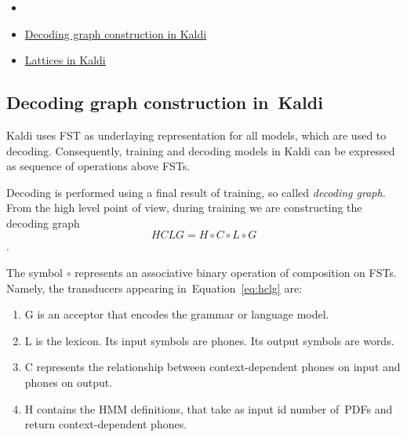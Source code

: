 \subsubsection*{} %

\begin{itemize}
    \item {}
    \item \href{http://kaldi.sourceforge.net/graph.html} {Decoding graph construction in Kaldi}
    \item \href{http://kaldi.sourceforge.net/lattices.html} {Lattices in Kaldi}
\end{itemize}

\subsection{Decoding graph construction in~Kaldi} %
Kaldi uses \ac{FST} as underlaying representation for all models, which are used to decoding. Consequently, 
training and decoding models in Kaldi can be expressed as sequence of operations above \acp{FST}.

Decoding is performed using a final result of training, so called {\it decoding graph}. 
From the high level point of view,
during training we are constructing the decoding graph 
\begin{equation} \label{eq:hclg}
HCLG = H\circ C\circ L\circ G
\end{equation}.

The symbol $\circ$ represents an associative binary operation of composition on \acp{FST}.
Namely, the transducers appearing in~Equation~\ref{eq:hclg} are:
\begin{enumerate}
    \item G is an acceptor that encodes the grammar or language model.
    \item L is the lexicon. Its input symbols are phones. Its output symbols are words.
    \item C represents the relationship between context-dependent phones on input and phones on output.
    \item H contains the \ac{HMM} definitions, that take as input id number of~\acp{PDF} and return context-dependent phones.
\end{enumerate}

